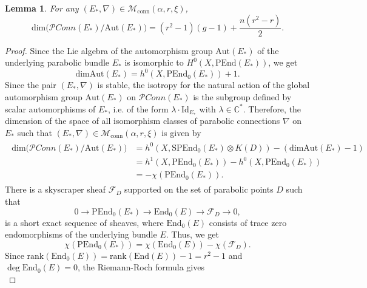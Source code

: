 \documentclass[11pt, reqno]{amsart}
\numberwithin{equation}{section}
\newtheorem{lemma}[theorem]{Lemma}
\theoremstyle{definition}
\begin{document}
	\begin{lemma}\label{dimension}
  For any $(E_*,\nabla) \in \mathcal{M}_{\mathrm{conn}}(\alpha, r, \xi)$,
		\[
      \mathrm{dim} \big(\mathcal{P}\textit{Conn}(E_*)/\mathrm{Aut}(E_*)\big) = (r^2-1)(g-1) + \frac{n(r^2-r)}{2}.
  \]
	\end{lemma}
	\begin{proof}
 Since the Lie algebra of the automorphism group $\mathrm{Aut}(E_*)$ of the underlying parabolic bundle $E_*$ is isomorphic to $H^0(X, \mathrm{PEnd}(E_*))$, we get
  \begin{equation}\label{automorphism}
  \mathrm{dim} \mathrm{Aut}(E_*) = h^0(X, \mathrm{PEnd}_0(E_*)) +1.
  \end{equation}
  Since the pair $(E_*,\nabla)$ is stable, the isotropy for the natural action of the global automorphism group $\mathrm{Aut}(E_*)$ on $\mathcal{P}\textit{Conn}(E_*)$ is the subgroup defined by scalar automorphisms of $E_*$, i.e. of the form $\lambda \cdot \mathrm{Id}_{E_*}$ with $\lambda \in \mathbb{C}^*$. Therefore, the dimension of the space of all isomorphism classes of parabolic connections $\nabla$ on $E_*$ such that $(E_*,\nabla) \in \mathcal{M}_{\mathrm{conn}}(\alpha, r, \xi)$ is given by
  \begin{align}\label{dim1}
  \begin{split}
      \mathrm{dim} \big(\mathcal{P}\textit{Conn}(E_*)/\mathrm{Aut}(E_*)\big) &= h^0(X, \mathrm{SPEnd}_0(E_*) \otimes K(D)) - (\mathrm{dim}\mathrm{Aut}(E_*) - 1)\\
      &= h^1(X,\mathrm{PEnd}_0(E_*)) - h^0(X, \mathrm{PEnd}_0(E_*)) \\
      &= -\chi(\mathrm{PEnd}_0(E_*)).
      \end{split}
  \end{align}
  There is a skyscraper sheaf $\mathcal{F}_D$ supported on the set of parabolic points $D$ such that 
  \[
  0 \longrightarrow \mathrm{PEnd}_0(E_*) \longrightarrow \mathrm{End}_0(E) \longrightarrow \mathcal{F}_D \longrightarrow 0,
  \]
  is a short exact sequence of sheaves, where $\mathrm{End}_0(E)$ consists of trace zero endomorphisms of the underlying bundle $E$. Thus, we get
  \begin{equation}\label{euler}
  \chi(\mathrm{PEnd}_0(E_*)) =   \chi(\mathrm{End}_0(E)) - \chi(\mathcal{F}_D).
  \end{equation}
 Since $\mathrm{rank}(\mathrm{End}_0(E)) = \mathrm{rank}(\mathrm{End}(E)) -1 = r^2-1$ and $\deg \mathrm{End}_0(E) = 0$, the Riemann-Roch formula gives
  \begin{equation}\label{euler1}

\end{equation}
\end{proof}
\end{document}
